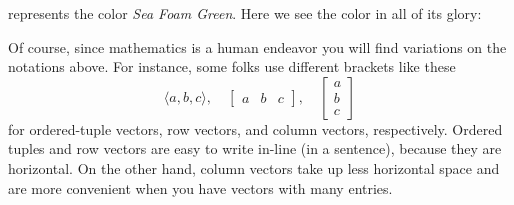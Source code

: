 \documentclass{ximera}
\begin{document}
\begin{concept}
\begin{description}
  represents the color \textit{Sea Foam Green}. Here we see the color in all of its glory:
  \begin{center}
    \colorbox[RGB]{159, 226, 191}{
      \parbox{1cm}{\rule{0pt}{1cm}}}
  \end{center}
\end{description}
\end{concept}

Of course, since mathematics is a human endeavor you will find
variations on the notations above. For instance, some folks use
different brackets like these
\[
\langle a, b, c \rangle, \quad \begin{bmatrix} a & b & c \end{bmatrix}, \quad
\begin{bmatrix}
  a\\
  b\\
  c
\end{bmatrix}
\]
for ordered-tuple vectors, row vectors, and column vectors,
respectively. Ordered tuples and row vectors are easy to write in-line
(in a sentence), because they are horizontal. On the other hand,
column vectors take up less horizontal space and are more convenient
when you have vectors with many entries.
\end{document}
